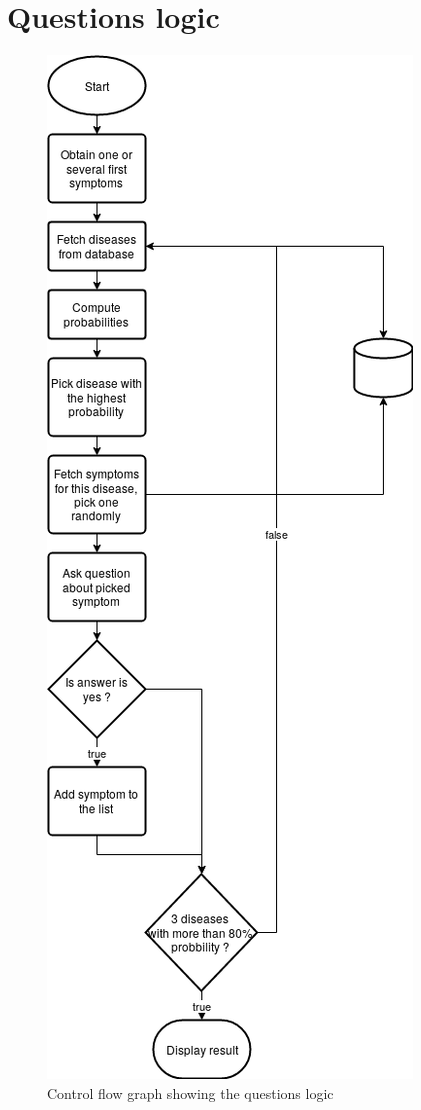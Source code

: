 \section{Questions logic}

\begin{figure}[H]
	\centering
	\includegraphics[height=0.9\textheight]{flow_chart_questions}
	\caption{Control flow graph showing the questions logic}
	\label{cfg_logic}
\end{figure}

